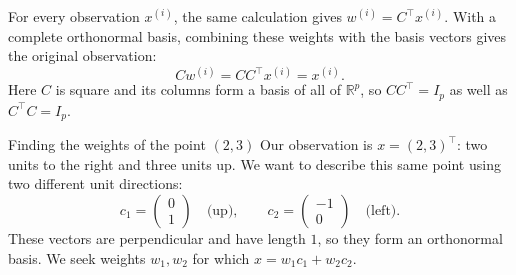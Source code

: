 \documentclass[a4paper,12pt,oneside]{report}
\begin{document}
For every observation $x^{(i)}$, the same calculation gives
$w^{(i)}=C^\top x^{(i)}$. With a complete orthonormal basis, combining
these weights with the basis vectors gives the original observation:
\[
  Cw^{(i)}=CC^\top x^{(i)}=x^{(i)}.
\]
Here $C$ is square and its columns form a basis of all of
$\mathbb{R}^p$, so $CC^\top=I_p$ as well as $C^\top C=I_p$.

\clearpage
\begin{framedexample}{Finding the weights of the point $(2,3)$}
Our observation is $x=(2,3)^\top$: two units to the right and three
units up. We want to describe this same point using two different
unit directions:
\[
  c_1=\begin{pmatrix}0\\1\end{pmatrix}
    \quad\text{(up)},\qquad
  c_2=\begin{pmatrix}-1\\0\end{pmatrix}
    \quad\text{(left)}.
\]
These vectors are perpendicular and have length $1$, so they form an
orthonormal basis. We seek weights $w_1,w_2$ for which
$x=w_1c_1+w_2c_2$.

\begin{center}
\end{center}


\end{framedexample}
\end{document}
